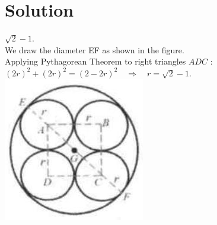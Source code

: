 \documentclass{article}
\begin{document}
\section*{Solution}
\(\sqrt{2}-1\).\\
We draw the diameter EF as shown in the figure.\\
Applying Pythagorean Theorem to right triangles \(A D C\) :\\
\((2 r)^{2}+(2 r)^{2}=(2-2 r)^{2} \quad \Rightarrow \quad r=\sqrt{2}-1\).\\
\centering
\includegraphics[width=\textwidth]{images/190.jpg}
\end{document}
